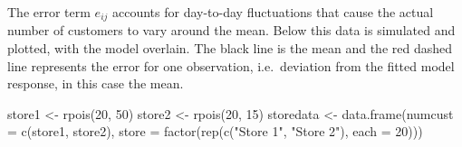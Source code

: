 \documentclass[
  letterpaper,
]{book}
\newenvironment{Shaded}{\begin{snugshade}}{\end{snugshade}}
\newcommand{\AttributeTok}[1]{\textcolor[rgb]{0.40,0.45,0.13}{#1}}
\newcommand{\DecValTok}[1]{\textcolor[rgb]{0.68,0.00,0.00}{#1}}
\newcommand{\FunctionTok}[1]{\textcolor[rgb]{0.28,0.35,0.67}{#1}}
\newcommand{\NormalTok}[1]{\textcolor[rgb]{0.00,0.23,0.31}{#1}}
\newcommand{\OtherTok}[1]{\textcolor[rgb]{0.00,0.23,0.31}{#1}}
\newcommand{\StringTok}[1]{\textcolor[rgb]{0.13,0.47,0.30}{#1}}
\begin{document}
The error term \(e_{ij}\) accounts for day-to-day fluctuations that
cause the actual number of customers to vary around the mean. Below this
data is simulated and plotted, with the model overlain. The black line
is the mean and the red dashed line represents the error for one
observation, i.e.~deviation from the fitted model response, in this case
the mean.

\begin{Shaded}
\begin{Highlighting}[]
\NormalTok{store1 }\OtherTok{\textless{}{-}} \FunctionTok{rpois}\NormalTok{(}\DecValTok{20}\NormalTok{, }\DecValTok{50}\NormalTok{)}
\NormalTok{store2 }\OtherTok{\textless{}{-}} \FunctionTok{rpois}\NormalTok{(}\DecValTok{20}\NormalTok{, }\DecValTok{15}\NormalTok{)}
\NormalTok{storedata }\OtherTok{\textless{}{-}} \FunctionTok{data.frame}\NormalTok{(}\AttributeTok{numcust =} \FunctionTok{c}\NormalTok{(store1, store2),}
                        \AttributeTok{store =} \FunctionTok{factor}\NormalTok{(}\FunctionTok{rep}\NormalTok{(}\FunctionTok{c}\NormalTok{(}\StringTok{"Store 1"}\NormalTok{, }\StringTok{"Store 2"}\NormalTok{), }\AttributeTok{each =} \DecValTok{20}\NormalTok{)))}


\end{Highlighting}
\end{Shaded}
\end{document}
